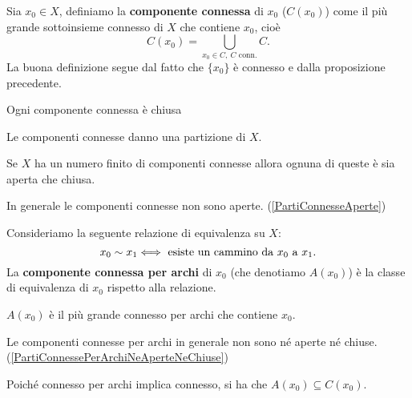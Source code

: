 \begin{multicols*}{2}
\begin{definition}
Sia $x_0\in X$, definiamo la \textbf{componente connessa} di $x_0$ ($C(x_0)$) come il più grande sottoinsieme connesso di $X$ che contiene $x_0$, cioè
\[C(x_0)=\bigcup_{x_0\in C,\ C\text{ conn.}}C.\]
La buona definizione segue dal fatto che $\{x_0\}$ è connesso e dalla proposizione precedente.
\end{definition}

\begin{proposition}\label{LeComponentiConnesseSonoChiuse}
Ogni componente connessa è chiusa
\end{proposition}

\begin{proposition}
Le componenti connesse danno una partizione di $X$.
\end{proposition}
\begin{corollary}
Se $X$ ha un numero finito di componenti connesse allora ognuna di queste è sia aperta che chiusa.
\end{corollary}

\begin{remark}
In generale le componenti connesse non sono aperte. (\ref{PartiConnesseAperte})
\end{remark}

\begin{definition}
Consideriamo la seguente relazione di equivalenza su $X$:
\[x_0\sim x_1\Longleftrightarrow \text{ esiste un cammino da $x_0$ a $x_1$}.\]
La \textbf{componente connessa per archi} di $x_0$ (che denotiamo $A(x_0)$) è la classe di equivalenza di $x_0$ rispetto alla relazione.
\end{definition}

\begin{proposition}\label{CaratterizzazioneDelleComponentiConnessePerArchi}
$A(x_0)$ è il più grande connesso per archi che contiene $x_0$.
\end{proposition}

\begin{remark}
Le componenti connesse per archi in generale non sono né aperte né chiuse. (\ref{PartiConnessePerArchiNeAperteNeChiuse})
\end{remark}

\begin{remark}
Poiché connesso per archi implica connesso, si ha che $A(x_0)\subseteq C(x_0)$.
\end{remark}


\end{multicols*}
